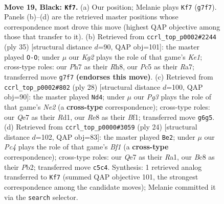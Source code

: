 \documentclass[11pt]{article}
\begin{document}
\clearpage

\begin{figure}[p]\centering
\begin{subfigure}{0.46\textwidth}\centering
\resizebox{\linewidth}{!}{%
\newchessgame
\chessboard[
  setfen={rnb1r3/3nq1kp/pp2p1p1/2p1P3/P2p4/8/NPPQ1PPP/1K2RBNR b - - 1 19},
  showmover=false,
  pgfstyle=straightmove, color=movearrow, markmove={g7-f7}
]}
\caption{}
\end{subfigure}\hfill
\begin{subfigure}{0.46\textwidth}\centering
\resizebox{\linewidth}{!}{%
\newchessgame
\chessboard[
  setfen={2q1k2r/r3n1bp/p1p3p1/2P1pp2/QPPp4/3B1P2/P5PP/R1B2RK1 b k - 0 18},
  showmover=false,
  pgfstyle=straightmove, color=movearrow, markmove={e8-g8}
]}
\caption{}
\end{subfigure}
\\[4pt]
\begin{subfigure}{0.46\textwidth}\centering
\resizebox{\linewidth}{!}{%
\newchessgame
\chessboard[
  setfen={r3k2r/1ppbbp1p/n6q/p2P1p2/2P1pP2/2N3P1/PPQ1N2P/2KR1B1R w kq - 2 15},
  showmover=false,
  pgfstyle=straightmove, color=movearrow, markmove={e2-d4}
]}
\caption{}
\end{subfigure}\hfill
\begin{subfigure}{0.46\textwidth}\centering
\resizebox{\linewidth}{!}{%
\newchessgame
\chessboard[
  setfen={r1b1k2r/ppp1bp1p/n6q/3P1p2/2P1p3/2N3N1/PPQ2PPP/R3KB1R w KQkq - 0 13},
  showmover=false,
  pgfstyle=straightmove, color=movearrow, markmove={f1-e2}
]}
\caption{}
\end{subfigure}
\caption{\textbf{Move 19, Black: \texttt{Kf7}.} (a) Our position; Melanie plays \texttt{Kf7} (\texttt{g7f7}). Panels (b)--(d) are the retrieved master positions whose correspondence most drove this move (highest QAP objective among those that transfer to it). (b) Retrieved from \texttt{ccrl\_top\_p0002\#2244} (ply 35) [structural distance $d$=90, QAP obj=101]: the master played \texttt{O-O}; under $\mu$ our \emph{Kg2} plays the role of that game's \emph{Ke1}; cross-type roles: our \emph{P}h7 as their \emph{R}h8, our \emph{P}c5 as their \emph{R}a7; transferred move \texttt{g7f7} \textbf{(endorses this move)}. (c) Retrieved from \texttt{ccrl\_top\_p0002\#802} (ply 28) [structural distance $d$=100, QAP obj=90]: the master played \texttt{Nd4}; under $\mu$ our \emph{Pg3} plays the role of that game's \emph{Ne2} (a \textbf{cross-type} correspondence); cross-type roles: our \emph{Q}e7 as their \emph{R}d1, our \emph{R}e8 as their \emph{B}f1; transferred move \texttt{g6g5}. (d) Retrieved from \texttt{ccrl\_top\_p0000\#3059} (ply 24) [structural distance $d$=102, QAP obj=83]: the master played \texttt{Be2}; under $\mu$ our \emph{Pc4} plays the role of that game's \emph{Bf1} (a \textbf{cross-type} correspondence); cross-type roles: our \emph{Q}e7 as their \emph{R}a1, our \emph{B}c8 as their \emph{P}b2; transferred move \texttt{c5c4}. Synthesis: 1 retrieved analog transferred to \texttt{Kf7} (summed QAP objective 101, the strongest correspondence among the candidate moves); Melanie committed it via the \texttt{search} selector.}
\label{fig:thought-m37}
\end{figure}
\end{document}
